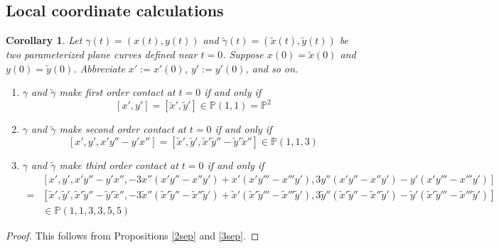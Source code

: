 \documentclass[12pt]{article}
\numberwithin{equation}{section}
\theoremstyle{plain}
\newtheorem{corollary}[definition]{Corollary}
\theoremstyle{definition}
\renewcommand{\P}{\mathbb{P}}
\begin{document}


\subsection{Local coordinate calculations}

\begin{corollary}\label{localcoordsj}Let $\gamma(t)=(x(t),y(t))$ and $\tilde{\gamma}(t)=(\tilde{x}(t),\tilde{y}(t))$ be two parameterized plane curves defined near $t=0$. Suppose $x(0)=\tilde{x}(0)$ and $y(0)=\tilde{y}(0)$. Abbreviate $x':=x'(0)$, $y':=y'(0)$, and so on.
\begin{enumerate}
\itemsep0em
\item{$\gamma$ and $\tilde{\gamma}$ make first order contact at $t=0$ if and only if
\[[x',y']=[\tilde{x}',\tilde{y}']\in \P(1,1)=\P^{2}\]}
\item{\label{secondord}$\gamma$ and $\tilde{\gamma}$ make second order contact at $t=0$ if and only if
\[[x',y',x'y''-y'x'']=[\tilde{x}',\tilde{y}',\tilde{x}'\tilde{y}''-\tilde{y}'\tilde{x}'']\in \P(1,1,3)\]}
\item{\label{thirdord}$\gamma$ and $\tilde{\gamma}$ make third order contact at $t=0$ if and only if
\begin{align*}
&\scriptstyle[x',y', x'y''-y'x'', -3x''(x'y'' -x''y') +  x'(x'y'''-x''' y'), 3y''(x'y'' -x''y') -  y'(x'y'''-x''' y')]\\
\scriptstyle=&\scriptstyle[\tilde{x}',\tilde{y}',\tilde{x}'\tilde{y}''-\tilde{y}'\tilde{x}'', -3\tilde{x}''(\tilde{x}'\tilde{y}'' -\tilde{x}''\tilde{y}') +  \tilde{x}'(\tilde{x}'\tilde{y}'''-\tilde{x}''' \tilde{y}'), 3\tilde{y}''(\tilde{x}'\tilde{y}'' -\tilde{x}''\tilde{y}') -  \tilde{y}'(\tilde{x}'\tilde{y}'''-\tilde{x}''' \tilde{y}')]\\
&\in \P(1,1,3,3,5,5)
\end{align*}
}
\end{enumerate} 
\end{corollary}
\begin{proof}This follows from Propositions \ref{2sep} and \ref{3sep}.
\end{proof}
\end{document}

